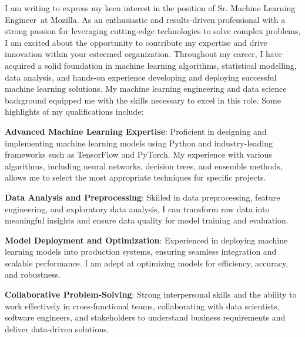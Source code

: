 \documentclass[11pt, a4paper]{awesome-cv} %
\newcommand{\Hiring}{Mozilla}
\newcommand{\job}{Sr.  Machine Learning Engineer}
\begin{document}
\makecvheader %

\makelettertitle %


\begin{cvletter}


I am writing to express my keen interest in the position of \job~at \Hiring. As an enthusiastic and results-driven professional with a strong passion for leveraging cutting-edge technologies to solve complex problems, I am excited about the opportunity to contribute my expertise and drive innovation within your esteemed organization.
Throughout my career, I have acquired a solid foundation in machine learning algorithms, statistical modelling, data analysis, and hands-on experience developing and deploying successful machine learning solutions. My machine learning engineering and data science background equipped me with the skills necessary to excel in this role.
Some highlights of my qualifications include:

\textbf{Advanced Machine Learning Expertise}: Proficient in designing and implementing machine learning models using Python and industry-leading frameworks such as TensorFlow and PyTorch. My experience with various algorithms, including neural networks, decision trees, and ensemble methods, allows me to select the most appropriate techniques for specific projects.

\textbf{Data Analysis and Preprocessing}: Skilled in data preprocessing, feature engineering, and exploratory data analysis, I can transform raw data into meaningful insights and ensure data quality for model training and evaluation.

\textbf{Model Deployment and Optimization}: Experienced in deploying machine learning models into production systems, ensuring seamless integration and scalable performance. I am adept at optimizing models for efficiency, accuracy, and robustness.

\textbf{Collaborative Problem-Solving}: Strong interpersonal skills and the ability to work effectively in cross-functional teams, collaborating with data scientists, software engineers, and stakeholders to understand business requirements and deliver data-driven solutions.


\end{cvletter}
\end{document}
